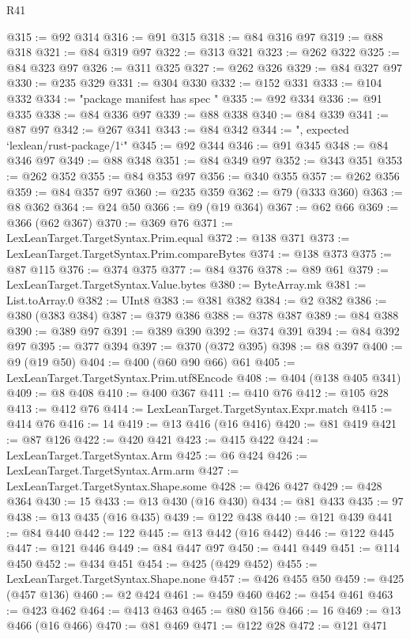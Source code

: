 \begin{lexlean}{R41}
\begin{coremodule}
@315 := @92 @314
@316 := @91 @315
@318 := @84 @316 @97
@319 := @88 @318
@321 := @84 @319 @97
@322 := @313 @321
@323 := @262 @322
@325 := @84 @323 @97
@326 := @311 @325
@327 := @262 @326
@329 := @84 @327 @97
@330 := @235 @329
@331 := @304 @330
@332 := @152 @331
@333 := @104 @332
@334 := "package manifest has spec "
@335 := @92 @334
@336 := @91 @335
@338 := @84 @336 @97
@339 := @88 @338
@340 := @84 @339
@341 := @87 @97
@342 := @267 @341
@343 := @84 @342
@344 := ", expected `lexlean/rust-package/1`"
@345 := @92 @344
@346 := @91 @345
@348 := @84 @346 @97
@349 := @88 @348
@351 := @84 @349 @97
@352 := @343 @351
@353 := @262 @352
@355 := @84 @353 @97
@356 := @340 @355
@357 := @262 @356
@359 := @84 @357 @97
@360 := @235 @359
@362 := @79 (@333 @360)
@363 := @8 @362
@364 := @24 @50
@366 := @9 (@19 @364)
@367 := @62 @66
@369 := @366 (@62 @367)
@370 := @369 @76
@371 := LexLeanTarget.TargetSyntax.Prim.equal
@372 := @138 @371
@373 := LexLeanTarget.TargetSyntax.Prim.compareBytes
@374 := @138 @373
@375 := @87 @115
@376 := @374 @375
@377 := @84 @376
@378 := @89 @61
@379 := LexLeanTarget.TargetSyntax.Value.bytes
@380 := ByteArray.mk
@381 := List.toArray.{0}
@382 := UInt8
@383 := @381 @382
@384 := @2 @382
@386 := @380 (@383 @384)
@387 := @379 @386
@388 := @378 @387
@389 := @84 @388
@390 := @389 @97
@391 := @389 @390
@392 := @374 @391
@394 := @84 @392 @97
@395 := @377 @394
@397 := @370 (@372 @395)
@398 := @8 @397
@400 := @9 (@19 @50)
@404 := @400 (@60 @90 @66) @61
@405 := LexLeanTarget.TargetSyntax.Prim.utf8Encode
@408 := @404 (@138 @405 @341)
@409 := @8 @408
@410 := @400 @367
@411 := @410 @76
@412 := @105 @28
@413 := @412 @76
@414 := LexLeanTarget.TargetSyntax.Expr.match
@415 := @414 @76
@416 := 14
@419 := @13 @416 (@16 @416)
@420 := @81 @419
@421 := @87 @126
@422 := @420 @421
@423 := @415 @422
@424 := LexLeanTarget.TargetSyntax.Arm
@425 := @6 @424
@426 := LexLeanTarget.TargetSyntax.Arm.arm
@427 := LexLeanTarget.TargetSyntax.Shape.some
@428 := @426 @427
@429 := @428 @364
@430 := 15
@433 := @13 @430 (@16 @430)
@434 := @81 @433
@435 := 97
@438 := @13 @435 (@16 @435)
@439 := @122 @438
@440 := @121 @439
@441 := @84 @440
@442 := 122
@445 := @13 @442 (@16 @442)
@446 := @122 @445
@447 := @121 @446
@449 := @84 @447 @97
@450 := @441 @449
@451 := @114 @450
@452 := @434 @451
@454 := @425 (@429 @452)
@455 := LexLeanTarget.TargetSyntax.Shape.none
@457 := @426 @455 @50
@459 := @425 (@457 @136)
@460 := @2 @424
@461 := @459 @460
@462 := @454 @461
@463 := @423 @462
@464 := @413 @463
@465 := @80 @156
@466 := 16
@469 := @13 @466 (@16 @466)
@470 := @81 @469
@471 := @122 @28
@472 := @121 @471

\end{coremodule}
\end{lexlean}
